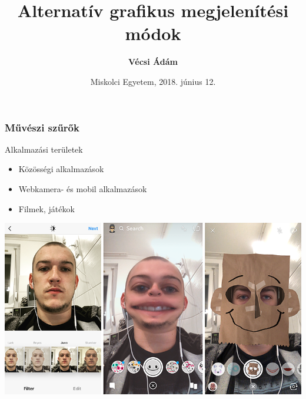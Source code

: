 \documentclass{beamer}
\begin{document}

\title[Alternatív grafikus megjelenítési módok]{Alternatív grafikus megjelenítési módok}
\author[Vécsi Ádám]{\textbf{Vécsi Ádám}}
\date{Miskolci Egyetem, 2018. június 12.}

\frame{\titlepage}

\begin{frame}[fragile]
\frametitle{Művészi szűrők}

Alkalmazási területek
\begin{itemize}
\item Közösségi alkalmazások
\item Webkamera- és mobil alkalmazások
\item Filmek, játékok
\end{itemize}

\bigskip

\begin{center}
\includegraphics[scale=0.25]{kepek/instasnapmess.png}
\end{center}

\end{frame}
\end{document}
